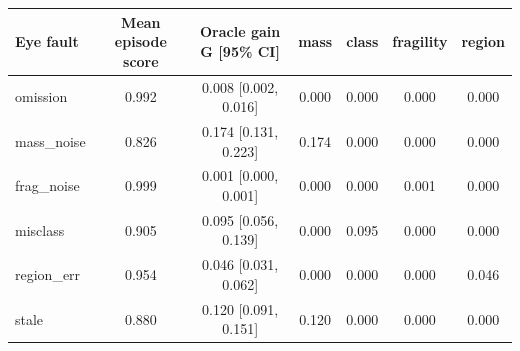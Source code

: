 \begin{tabular}{lcccccc}
\toprule
Eye fault & Mean episode score & Oracle gain G [95\% CI] & mass & class & fragility & region \\
\midrule
omission & 0.992 & 0.008 [0.002, 0.016] & 0.000 & 0.000 & 0.000 & 0.000 \\
mass\_noise & 0.826 & 0.174 [0.131, 0.223] & 0.174 & 0.000 & 0.000 & 0.000 \\
frag\_noise & 0.999 & 0.001 [0.000, 0.001] & 0.000 & 0.000 & 0.001 & 0.000 \\
misclass & 0.905 & 0.095 [0.056, 0.139] & 0.000 & 0.095 & 0.000 & 0.000 \\
region\_err & 0.954 & 0.046 [0.031, 0.062] & 0.000 & 0.000 & 0.000 & 0.046 \\
stale & 0.880 & 0.120 [0.091, 0.151] & 0.120 & 0.000 & 0.000 & 0.000 \\
\bottomrule
\end{tabular}
